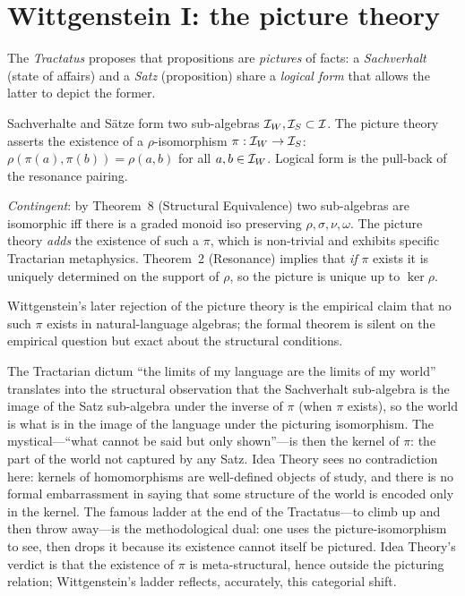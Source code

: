 \section{Wittgenstein I: the picture theory}\label{sec:wittgensteinI}

 The \emph{Tractatus} \cite{Wittgenstein1922}
proposes that propositions are \emph{pictures} of facts: a
\emph{Sachverhalt} (state of affairs) and a \emph{Satz} (proposition)
share a \emph{logical form} that allows the latter to depict the
former.

\formalclaim Sachverhalte and S\"atze form two sub-algebras
$\mathcal{I}_W,\mathcal{I}_S\subset\mathcal{I}$. The picture theory asserts the
existence of a $\rho$-isomorphism $\pi:\mathcal{I}_W\to\mathcal{I}_S$:
$\rho(\pi(a),\pi(b)) = \rho(a,b)$ for all $a,b\in\mathcal{I}_W$. Logical
form is the pull-back of the resonance pairing.

\formalstatus \emph{Contingent}: by Theorem~8 (Structural Equivalence)
two sub-algebras are isomorphic iff there is a graded monoid iso
preserving $\rho, \sigma, \nu, \omega$. The picture theory \emph{adds}
the existence of such a $\pi$, which is non-trivial and exhibits
specific Tractarian metaphysics. Theorem~2 (Resonance) implies that
\emph{if} $\pi$ exists it is uniquely determined on the support of
$\rho$, so the picture is unique up to $\ker\rho$.

\litcomment Wittgenstein's later rejection of the picture theory is the
empirical claim that no such $\pi$ exists in natural-language algebras;
the formal theorem is silent on the empirical question but exact about
the structural conditions.

The Tractarian dictum ``the limits of my language are the limits of my
world'' translates into the structural observation that the Sachverhalt
sub-algebra is the image of the Satz sub-algebra under the inverse of
$\pi$ (when $\pi$ exists), so the world is what is in the image of the
language under the picturing isomorphism. The mystical---``what cannot
be said but only shown''---is then the kernel of $\pi$: the part of the
world not captured by any Satz. Idea Theory sees no contradiction here:
kernels of homomorphisms are well-defined objects of study, and there
is no formal embarrassment in saying that some structure of the world
is encoded only in the kernel. The famous ladder at the end of the
Tractatus---to climb up and then throw away---is the methodological
dual: one uses the picture-isomorphism to see, then drops it because
its existence cannot itself be pictured. Idea Theory's verdict is that
the existence of $\pi$ is meta-structural, hence outside the picturing
relation; Wittgenstein's ladder reflects, accurately, this categorial
shift.

